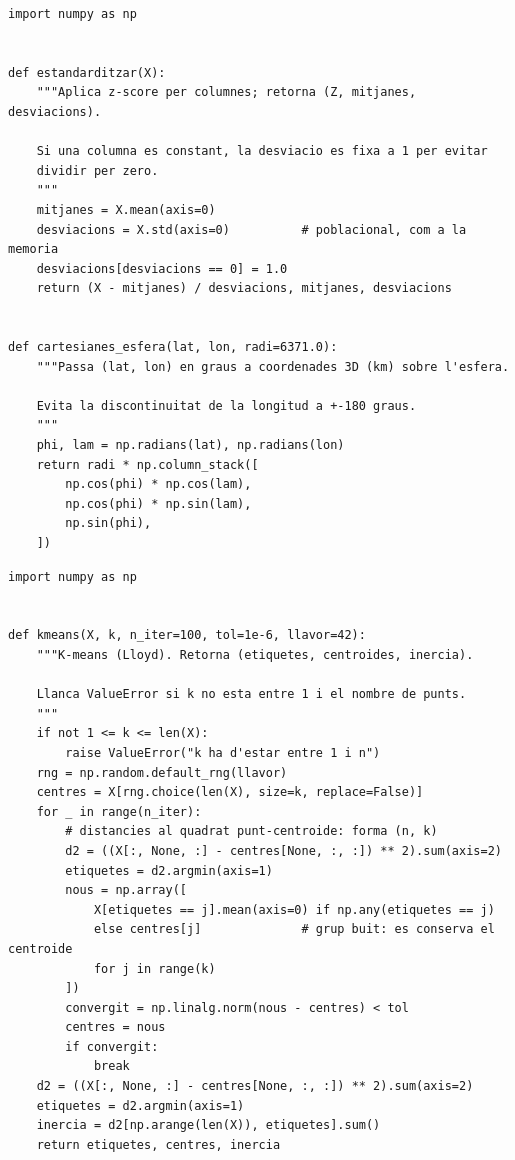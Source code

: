 \documentclass[11pt,a4paper]{article}
\begin{document}
\begin{lstlisting}[caption={Preprocessament (\texttt{preprocessament.py}).},label={lst:prep}]
import numpy as np


def estandarditzar(X):
    """Aplica z-score per columnes; retorna (Z, mitjanes, desviacions).

    Si una columna es constant, la desviacio es fixa a 1 per evitar
    dividir per zero.
    """
    mitjanes = X.mean(axis=0)
    desviacions = X.std(axis=0)          # poblacional, com a la memoria
    desviacions[desviacions == 0] = 1.0
    return (X - mitjanes) / desviacions, mitjanes, desviacions


def cartesianes_esfera(lat, lon, radi=6371.0):
    """Passa (lat, lon) en graus a coordenades 3D (km) sobre l'esfera.

    Evita la discontinuitat de la longitud a +-180 graus.
    """
    phi, lam = np.radians(lat), np.radians(lon)
    return radi * np.column_stack([
        np.cos(phi) * np.cos(lam),
        np.cos(phi) * np.sin(lam),
        np.sin(phi),
    ])
\end{lstlisting}

\begin{lstlisting}[caption={\textit{K-means} vectoritzat (\texttt{clustering.py}).},label={lst:kmeans}]
import numpy as np


def kmeans(X, k, n_iter=100, tol=1e-6, llavor=42):
    """K-means (Lloyd). Retorna (etiquetes, centroides, inercia).

    Llanca ValueError si k no esta entre 1 i el nombre de punts.
    """
    if not 1 <= k <= len(X):
        raise ValueError("k ha d'estar entre 1 i n")
    rng = np.random.default_rng(llavor)
    centres = X[rng.choice(len(X), size=k, replace=False)]
    for _ in range(n_iter):
        # distancies al quadrat punt-centroide: forma (n, k)
        d2 = ((X[:, None, :] - centres[None, :, :]) ** 2).sum(axis=2)
        etiquetes = d2.argmin(axis=1)
        nous = np.array([
            X[etiquetes == j].mean(axis=0) if np.any(etiquetes == j)
            else centres[j]              # grup buit: es conserva el centroide
            for j in range(k)
        ])
        convergit = np.linalg.norm(nous - centres) < tol
        centres = nous
        if convergit:
            break
    d2 = ((X[:, None, :] - centres[None, :, :]) ** 2).sum(axis=2)
    etiquetes = d2.argmin(axis=1)
    inercia = d2[np.arange(len(X)), etiquetes].sum()
    return etiquetes, centres, inercia
\end{lstlisting}
\end{document}
